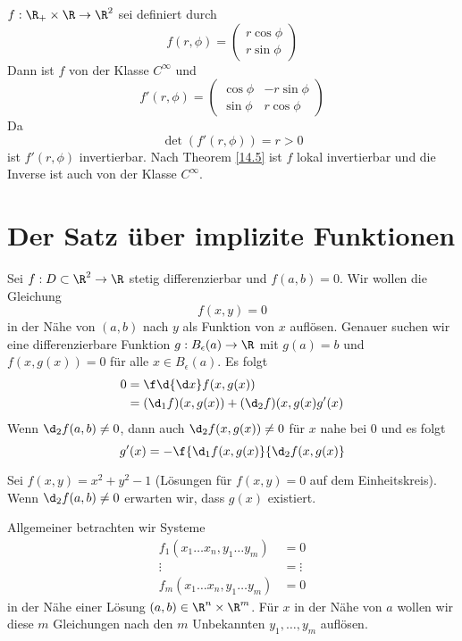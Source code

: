 \documentclass[a4paper,10pt]{scrbook}
\begin{document}
\begin{ex*}
$f:\R_+\times \R \to \R^2$ sei definiert durch
\[
f(r,\phi) = \begin{pmatrix}r\cos \phi \\ r\sin \phi\end{pmatrix}
\]
Dann ist $f$ von der Klasse $C^\infty$ und
\[
f'(r,\phi) = \begin{pmatrix} \cos \phi & -r\sin \phi \\ \sin\phi & r\cos\phi\end{pmatrix}
\]
Da
\[
\det(f'(r,\phi)) = r > 0
\]
ist $f'(r,\phi)$ invertierbar.
Nach Theorem \ref{14.5} ist $f$ lokal invertierbar und die Inverse ist auch von der Klasse $C^\infty$.
\end{ex*}


\section{Der Satz über implizite Funktionen}

Sei $f:D\subset \R^2 \to \R$ stetig differenzierbar und $f(a,b)=0$.
Wir wollen die Gleichung
\[
f(x,y) = 0
\]
in der Nähe von $(a,b)$ nach $y$ als Funktion von $x$ auflösen.
Genauer suchen wir eine differenzierbare Funktion $g:B_\epsilon(a) \to \R$ mit $g(a)=b$ und $f(x,g(x))=0$ für alle $x\in B_\epsilon (a)$.
Es folgt
\begin{align*}
0 &= \f \d{\d x} f(x,g(x)) \\
&= (\d_1f)(x,g(x)) +(\d_2f)(x,g(x) g'(x)
\end{align*}
Wenn $\d_2f(a,b)\neq 0$, dann auch $\d_2f(x,g(x)) \neq 0$ für $x$ nahe bei $0$ und es folgt
\[
g'(x) = -\f {\d_1f(x,g(x)}{\d_2f(x,g(x)}
\]

\begin{ex*}
Sei $f(x,y) = x^2+y^2 - 1$ (Lösungen für $f(x,y)=0$ auf dem Einheitskreis).
Wenn $\d_2f(a,b)\neq 0$ erwarten wir, dass $g(x)$ existiert.
\end{ex*}

Allgemeiner betrachten wir Systeme
\begin{align*}
f_1(x_1\dotsc x_n, y_1\dotsc y_m) &= 0\\
\vdots \qquad &= \vdots \\
f_m(x_1\dotsc x_n, y_1\dotsc y_m) &= 0
\end{align*}
in der Nähe einer Lösung $(a,b)\in \R^n\times \R^m$.
Für $x$ in der Nähe von $a$ wollen wir diese $m$ Gleichungen nach den $m$ Unbekannten $y_1,\dotsc, y_m$ auflösen.
\end{document}
